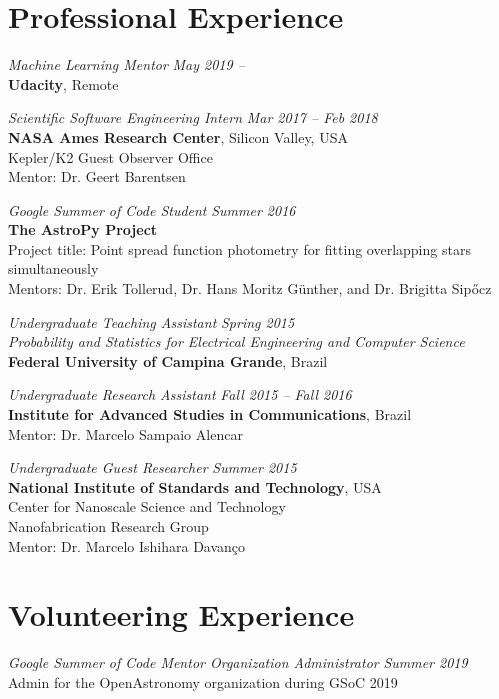 \documentclass[10pt]{article}
\begin{document}
\begin{titlepage}
\section*{Professional Experience}
\emph{Machine Learning Mentor} \hfill \textit{May 2019  --}
\\\textbf{Udacity}, Remote
\vspace{.5cm}

\emph{Scientific Software Engineering Intern} \hfill \textit{Mar 2017 -- Feb 2018}
\\\textbf{NASA Ames Research Center}, Silicon Valley, USA
\\Kepler/K2 Guest Observer Office
\\Mentor: Dr. Geert Barentsen
\vspace{.5cm}

\emph{Google Summer of Code Student} \hfill \textit{Summer 2016}
\\\textbf{The AstroPy Project}
\\ Project title: Point spread function photometry for fitting overlapping stars simultaneously
    \\Mentors: Dr. Erik Tollerud, Dr. Hans Moritz G\"unther, and Dr. Brigitta Sip\H{o}cz
\vspace{.5cm}

\emph{Undergraduate Teaching Assistant} \hfill \textit{Spring 2015}
\\\emph{Probability and Statistics for Electrical Engineering and Computer Science}
\\\textbf{Federal University of Campina Grande}, Brazil
\vspace{.5cm}

\emph{Undergraduate Research Assistant} \hfill \textit{Fall 2015 -- Fall 2016}
\\\textbf{Institute for Advanced Studies in Communications}, Brazil
\\Mentor: Dr. Marcelo Sampaio Alencar
\vspace{.5cm}

\emph{Undergraduate Guest Researcher} \hfill \textit{Summer 2015}
\\\textbf{National Institute of Standards and Technology}, USA
\\Center for Nanoscale Science and Technology
\\Nanofabrication Research Group
\\Mentor: Dr. Marcelo Ishihara Davan\c co
\vspace{.5cm}

\section*{Volunteering Experience}
\emph{Google Summer of Code Mentor Organization Administrator} \hfill \textit{Summer 2019}
\\Admin for the OpenAstronomy organization during GSoC 2019
\vspace{.5cm}


\end{titlepage}
\end{document}
